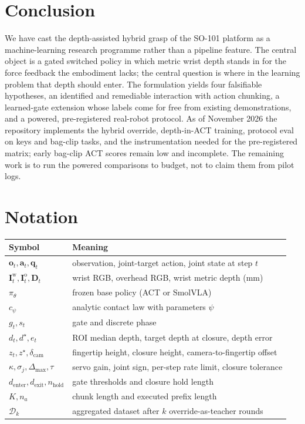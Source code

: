 \documentclass[11pt,a4paper]{article}
\theoremstyle{definition}
\newcommand{\obs}{\bm{o}}
\newcommand{\act}{\bm{a}}
\newcommand{\state}{\bm{q}}
\newcommand{\img}{\bm{I}}
\newcommand{\depthmap}{\bm{D}}
\newcommand{\pol}{\pi_\theta}
\newcommand{\ctrl}{c_\psi}
\newcommand{\gate}{g}
\begin{document}
\section{Conclusion}

We have cast the depth-assisted hybrid grasp of the SO-101 platform as a machine-learning research programme rather than a pipeline feature. The central object is a gated switched policy in which metric wrist depth stands in for the force feedback the embodiment lacks; the central question is where in the learning problem that depth should enter. The formulation yields four falsifiable hypotheses, an identified and remediable interaction with action chunking, a learned-gate extension whose labels come for free from existing demonstrations, and a powered, pre-registered real-robot protocol. As of November 2026 the repository implements the hybrid override, depth-in-ACT training, protocol eval on keys and bag-clip tasks, and the instrumentation needed for the pre-registered matrix; early bag-clip ACT scores remain low and incomplete. The remaining work is to run the powered comparisons to budget, not to claim them from pilot logs.




\appendix
\section{Notation}
\begin{table}[h]
\centering\small
\begin{tabular}{@{}ll@{}}
\toprule
Symbol & Meaning \\
\midrule
$\obs_t,\act_t,\state_t$ & observation, joint-target action, joint state at step $t$ \\
$\img^{\mathrm{w}}_t,\img^{\mathrm{o}}_t,\depthmap_t$ & wrist RGB, overhead RGB, wrist metric depth (mm) \\
$\pol$ & frozen base policy (ACT or SmolVLA) \\
$\ctrl$ & analytic contact law with parameters $\psi$ \\
$\gate_t, s_t$ & gate and discrete phase \\
$d_t, d^\star, e_t$ & ROI median depth, target depth at closure, depth error \\
$z_t, z^\star, \delta_{\mathrm{cam}}$ & fingertip height, closure height, camera-to-fingertip offset \\
$\kappa,\sigma_j,\Delta_{\max},\tau$ & servo gain, joint sign, per-step rate limit, closure tolerance \\
$d_{\mathrm{enter}},d_{\mathrm{exit}},n_{\mathrm{hold}}$ & gate thresholds and closure hold length \\
$K,n_a$ & chunk length and executed prefix length \\
$\mathcal{D}_k$ & aggregated dataset after $k$ override-as-teacher rounds \\
\bottomrule
\end{tabular}
\end{table}
\end{document}
